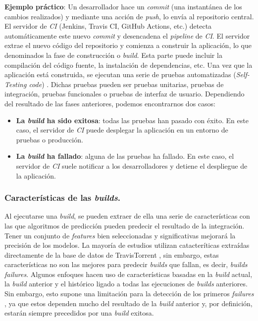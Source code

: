 \textbf{Ejemplo práctico}: Un desarrollador hace un \textit{commit} (una
instantánea de los cambios realizados) y mediante una acción de \textit{push}, lo envía al
repositorio central. El servidor de \textit{CI} \cite{9} (Jenkins, Travis CI, GitHub Actions,
etc.) detecta automáticamente este nuevo \textit{commit} y desencadena el \textit{pipeline} de
\textit{CI}. El servidor extrae el nuevo código del repositorio y comienza a construir la
aplicación, lo que denominados la fase de construcción o \textit{build}. Esta parte puede incluir
la compilación del código fuente, la instalación de dependencias, etc. Una vez que la aplicación
está construida, se ejecutan una serie de pruebas automatizadas (\textit{Self-Testing code})
\cite{10}. Dichas pruebas pueden ser pruebas unitarias, pruebas de integración, pruebas
funcionales o pruebas de interfaz de usuario. Dependiendo del resultado de las fases anteriores,
podemos encontrarnos dos casos:

\begin{itemize}
    \item \textbf{La \textit{build} ha sido exitosa}: todas las pruebas han pasado con éxito. En
          este caso, el servidor de \textit{CI} puede desplegar la aplicación en un entorno de
          pruebas o producción.
    \item \textbf{La \textit{build} ha fallado}: alguna de las pruebas ha fallado. En este caso,
          el servidor de \textit{CI} suele notificar a los desarrolladores y detiene el
          despliegue de la aplicación.
\end{itemize}


\subsubsection{Características de las \textit{builds}.}
Al ejecutarse una \textit{build}, se pueden extraer de ella una serie de características con las
que algoritmos de predicción pueden predecir el resultado de la integración. Tener un conjunto
de \textit{features} bien seleccionadas y significativas mejorará la precisión de los modelos.
La mayoría de estudios utilizan catacteríticas extraídas directamente de la base de datos de
TravisTorrent \cite{6}, sin embargo, estas características no son las mejores para predecir
\textit{builds} que fallan, es decir, \textit{builds failures}. Algunos enfoques \cite{7,8}
hacen uso de características basadas en la \textit{build} actual, la \textit{build} anterior y
el histórico ligado a todas las ejecuciones de \textit{builds} anteriores. Sin embargo, esto
supone una limitación para la detección de los primeros \textit{failures} \cite{2}, ya que estos
dependen mucho del resultado de la \textit{build} anterior y, por definición, estarán siempre
precedidos por una \textit{build} exitosa.\\

